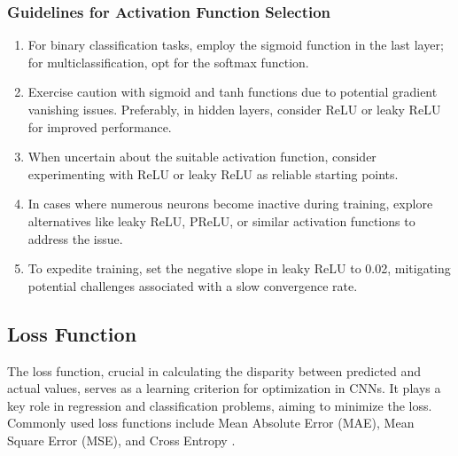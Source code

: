 \subsubsection{Guidelines for Activation Function Selection}

\begin{enumerate}
	\item For binary classification tasks, employ the sigmoid function in the last layer; for multiclassification, opt for the softmax function.
	\item Exercise caution with sigmoid and tanh functions due to potential gradient vanishing issues. Preferably, in hidden layers, consider ReLU or leaky ReLU for improved performance.
	\item When uncertain about the suitable activation function, consider experimenting with ReLU or leaky ReLU as reliable starting points.
	\item In cases where numerous neurons become inactive during training, explore alternatives like leaky ReLU, PReLU, or similar activation functions to address the issue.
	\item To expedite training, set the negative slope in leaky ReLU to 0.02, mitigating potential challenges associated with a slow convergence rate.
\end{enumerate}


\subsection{Loss Function}
\label{subsection:LossFunction}

The loss function, crucial in calculating the disparity between predicted and actual values, serves as a learning criterion for optimization in CNNs. It plays a key role in regression and classification problems, aiming to minimize the loss. Commonly used loss functions include Mean Absolute Error (MAE), Mean Square Error (MSE), and Cross Entropy \cite{Li:2021}.

